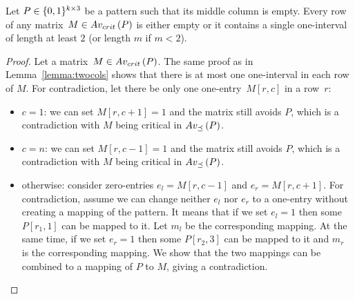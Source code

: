 \begin{lemma}
\label{lemma:maxmult}
Let $P\in\{0,1\}^{k\times3}$ be a pattern such that its middle column is empty. Every row of any matrix~$M\in Av_{crit}\left(P\right)$ is either empty or it contains a single one-interval of length at least $2$ (or length $m$ if $m<2$).
\end{lemma}
\begin{proof}
Let a matrix~$M\in Av_{crit}\left(P\right)$. The same proof as in Lemma~\ref{lemma:twocols} shows that there is at most one one-interval in each row of $M$. For contradiction, let there be only one one-entry~$M[r,c]$ in a row~$r$:
\begin{itemize}
	\item $c=1$: we can set $M[r,c+1]=1$ and the matrix still avoids $P$, which is a contradiction with $M$ being critical in $Av_{\preceq}\left(P\right)$.
	\item $c=n$: we can set $M[r,c-1]=1$ and the matrix still avoids $P$, which is a contradiction with $M$ being critical in $Av_{\preceq}\left(P\right)$.
	\item otherwise: consider zero-entries $e_l=M[r,c-1]$ and $e_r=M[r,c+1]$. For contradiction, assume we can change neither $e_l$ nor $e_r$ to a one-entry without creating a mapping of the pattern. It means that if we set $e_l=1$ then some $P[r_1,1]$ can be mapped to it. Let $m_l$ be the corresponding mapping. At the same time, if we set $e_r=1$ then some $P[r_2,3]$ can be mapped to it and $m_r$ is the corresponding mapping. We show that the two mappings can be combined to a mapping of $P$ to $M$, giving a contradiction.
	

\end{itemize}
\end{proof}
